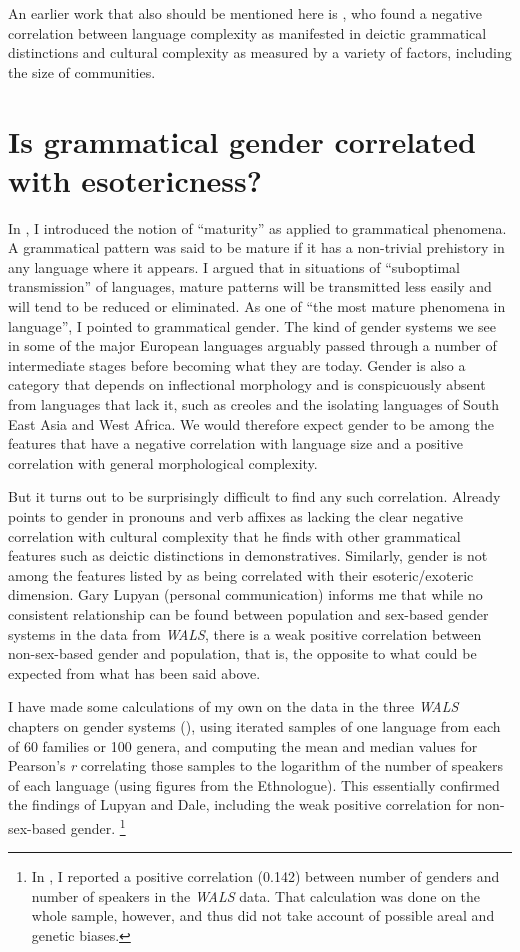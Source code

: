 \documentclass[output=collectionpaper]{langsci/langscibook}
\begin{document}
An earlier work that also should be mentioned here is \citet{Perkins1992}, who found a negative correlation between language complexity as manifested in deictic grammatical distinctions and cultural complexity as measured by a variety of factors, including the size of communities.

\section{Is grammatical gender correlated with esotericness?}

In \citet{Dahl2004}, I introduced the notion of  ``maturity'' as applied to grammatical phenomena. A grammatical pattern was said to be mature if it has a non-trivial prehistory in any language where it appears. I argued that in situations of ``suboptimal transmission'' of languages, mature patterns will be transmitted less easily and will tend to be reduced or eliminated.  As one of ``the most mature phenomena in language'', I pointed to grammatical gender. The kind of gender systems we see in some of the major European languages arguably passed through a number of intermediate stages before becoming what they are today. Gender is also a category that depends on inflectional morphology and is conspicuously absent from languages that lack it, such as creoles and the isolating languages of South East Asia and West Africa. We would therefore expect gender to be among the features that have a negative correlation with language size and a positive correlation with general morphological complexity.

But it turns out to be surprisingly difficult to find any such correlation. Already \citet[157]{Perkins1992} points to gender in pronouns and verb affixes as lacking the clear negative correlation with cultural complexity that he finds with other grammatical features such as deictic distinctions in demonstratives. Similarly, gender is not among the features listed by \citet{Lupyan2010} as being correlated with their esoteric/exoteric dimension. Gary Lupyan (personal communication) informs me that while no consistent relationship can be found between population and sex-based gender systems in the data from \textit{WALS}, there is a weak positive correlation between non-sex-based gender and population, that is, the opposite to what could be expected from what has been said above.

I have made some calculations of my own on the data in the three \textit{WALS} chapters on gender systems (\citealt{Corbett2013,Corbett2013a,Corbett2013b}), using iterated samples of one language from each of 60 families or 100 genera, and computing the mean and median values for Pearson’s \textit{r} correlating those samples to the logarithm of the number of speakers of each language (using figures from the Ethnologue). This essentially confirmed the findings of Lupyan and Dale, including the weak positive correlation for non-sex-based gender.%
\footnote{In \citet{Dahl2011}, I reported a positive correlation (0.142) between number of genders and number of speakers in the \textit{WALS} data. That calculation was done on the whole sample, however, and thus did not take account of possible areal and genetic biases.}
\end{document}

